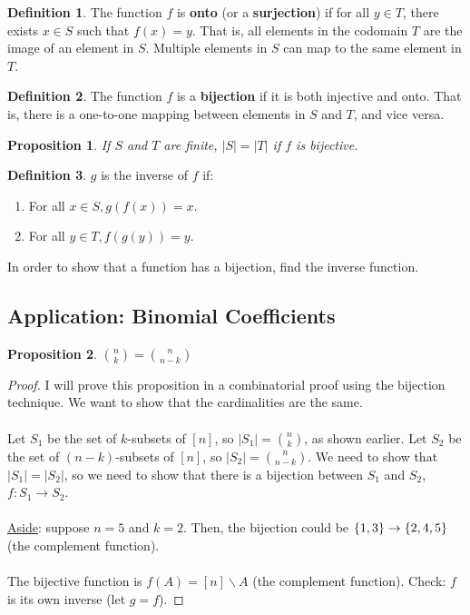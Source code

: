 \documentclass[]{article}
\newtheorem*{proposition}{Proposition}
\theoremstyle{definition}
\newtheorem*{defn}{Definition}
\DeclarePairedDelimiter{\set}{\lbrace}{\rbrace}
\begin{document}
			\begin{defn}
				The function $f$ is \textbf{onto} (or a \textbf{surjection}) if for all $y \in T$, there exists $x \in S$ such that $f(x) = y$. That is, all elements in the codomain $T$ are the image of an element in $S$. Multiple elements in $S$ can map to the same element in $T$.
			\end{defn}

			\begin{defn}
				The function $f$ is a \textbf{bijection} if it is both injective and onto. That is, there is a one-to-one mapping between elements in $S$ and $T$, and vice versa.
			\end{defn}

			\begin{proposition}
				If $S$ and $T$ are finite, $|S| = |T|$ if $f$ is bijective.
			\end{proposition}

			\begin{defn}
				$g$ is the inverse of $f$ if:
				\begin{enumerate}
					\item For all $x \in S, g(f(x)) = x$.
					\item For all $y \in T, f(g(y)) = y$.
				\end{enumerate}
			\end{defn}

			In order to show that a function has a bijection, find the inverse function.

			\subsection{Application: Binomial Coefficients}
				\begin{proposition}
					$\displaystyle \binom{n}{k} = \binom{n}{n - k}$
				\end{proposition}

				\begin{proof}
					I will prove this proposition in a combinatorial proof using the bijection technique. We want to show that the cardinalities are the same.
					\\ \\
					Let $S_1$ be the set of $k$-subsets of $[n]$, so $|S_1| = \binom{n}{k}$, as shown earlier. Let $S_2$ be the set of $(n-k)$-subsets of $[n]$, so $|S_2| = \binom{n}{n - k}$. We need to show that $|S_1| = |S_2|$, so we need to show that there is a bijection between $S_1$ and $S_2$, $f: S_1 \to S_2$.
					\\ \\
					\underline{Aside}: suppose $n = 5$ and $k = 2$. Then, the bijection could be $\set{1, 3} \to \set{2, 4, 5}$ (the complement function).
					\\ \\
					The bijective function is $f(A) = [n]\backslash A$ (the complement function). Check: $f$ is its own inverse (let $g = f$).
				\end{proof}
\end{document}
